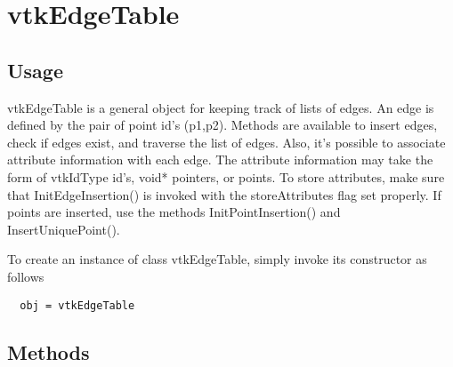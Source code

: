 \section{vtkEdgeTable}

\subsection{Usage}

 vtkEdgeTable is a general object for keeping track of lists of edges. An
 edge is defined by the pair of point id's (p1,p2). Methods are available
 to insert edges, check if edges exist, and traverse the list of edges.
 Also, it's possible to associate attribute information with each edge.
 The attribute information may take the form of vtkIdType id's, void*
 pointers, or points. To store attributes, make sure that
 InitEdgeInsertion() is invoked with the storeAttributes flag set properly.
 If points are inserted, use the methods InitPointInsertion() and 
 InsertUniquePoint().

To create an instance of class vtkEdgeTable, simply
invoke its constructor as follows
\begin{verbatim}
  obj = vtkEdgeTable
\end{verbatim}
\subsection{Methods}

